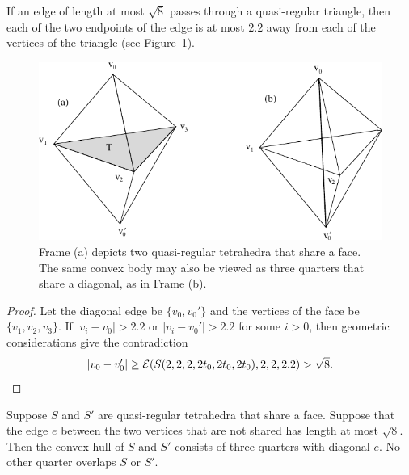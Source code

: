 \begin{lemma} \label{lemma:qrtet-pair-pass}
If an edge of length at most $\sqrt{8}$ passes through a
quasi-regular triangle, then each of the two endpoints of the edge
is at most $2.2$ away from each of the vertices of the triangle
(see Figure~\ref{fig:dia31}).
\end{lemma}

\begin{figure}[htb]
  \centering
  \includegraphics{PS/dia31.pdf}
  \caption{Frame (a) depicts two quasi-regular tetrahedra that share
  a face.  The same convex body may also be viewed as three quarters
  that share a diagonal, as in Frame (b).}
  \label{fig:dia31}
\end{figure}


\begin{proof}
Let the diagonal edge be $\{v_0,v_0'\}$ and the vertices of the
face be $\{v_1,v_2,v_3\}$.  If $|v_i-v_0|>2.2$ or $|v_i-v_0'|>2.2$
for some $i>0$, then geometric considerations give the
contradiction
$$|v_0-v_0'|\ge{{\mathcal E}}(S(2,2,2,2t_0,2t_0,2t_0),2,2,2.2) > \sqrt8.$$
\end{proof}

%

\begin{lemma}\label{lemma:qrtet-quarter}
Suppose $S$ and $S'$ are quasi-regular tetrahedra that share a
face.  Suppose that the edge $e$ between the two vertices that are
not shared has length at most $\sqrt8$.   Then the convex hull of
$S$ and $S'$ consists of three quarters with diagonal $e$.  No
other quarter overlaps $S$ or $S'$.
\end{lemma}

